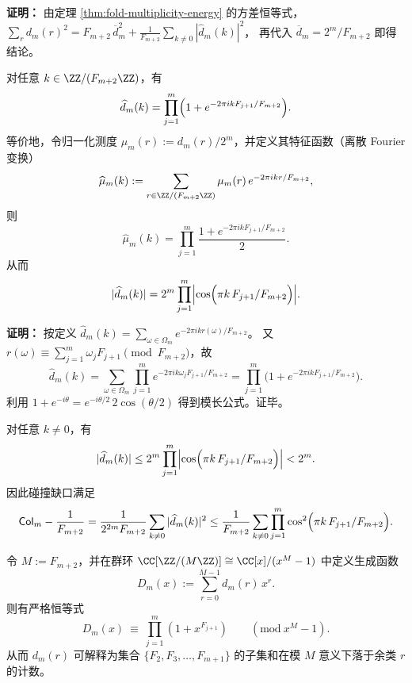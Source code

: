 \textbf{证明：}
由定理 \ref{thm:fold-multiplicity-energy} 的方差恒等式，
\(
\sum_r d_m(r)^2=F_{m+2}\,\overline d_m^2+\frac{1}{F_{m+2}}\sum_{k\ne 0}|\widehat d_m(k)|^2
\)，
再代入 $\overline d_m=2^m/F_{m+2}$ 即得结论。

\begin{theorem}
\label{thm:fold-spectrum-factorization}
对任意 $k\in\ZZ/(F_{m+2}\ZZ)$，有
\[
\widehat d_m(k)=\prod_{j=1}^m\Bigl(1+e^{-2\pi i k F_{j+1}/F_{m+2}}\Bigr).
\]
等价地，令归一化测度 \(\mu_m(r):=d_m(r)/2^m\)，并定义其特征函数（离散 Fourier 变换）
\[
\widehat\mu_m(k):=\sum_{r\in\ZZ/(F_{m+2}\ZZ)}\mu_m(r)\,e^{-2\pi i kr/F_{m+2}},
\]
则
\[
\widehat\mu_m(k)=\prod_{j=1}^m\frac{1+e^{-2\pi i k F_{j+1}/F_{m+2}}}{2}.
\]
从而
\[
|\widehat d_m(k)|=2^m\prod_{j=1}^m\Bigl|\cos\Bigl(\pi k\,F_{j+1}/F_{m+2}\Bigr)\Bigr|.
\]
\end{theorem}

\textbf{证明：}
按定义
\(
\widehat d_m(k)=\sum_{\omega\in\Omega_m}e^{-2\pi i k r(\omega)/F_{m+2}}
\)。
又 \(r(\omega)\equiv \sum_{j=1}^m \omega_j F_{j+1}\pmod{F_{m+2}}\)，故
\[
\widehat d_m(k)=\sum_{\omega\in\Omega_m}\prod_{j=1}^m e^{-2\pi i k\omega_j F_{j+1}/F_{m+2}}
=\prod_{j=1}^m\bigl(1+e^{-2\pi i k F_{j+1}/F_{m+2}}\bigr).
\]
利用 $1+e^{-i\theta}=e^{-i\theta/2}\,2\cos(\theta/2)$ 得到模长公式。证毕。

\begin{corollary}[非平凡频谱的乘性上界]
\label{cor:fold-spectrum-nontrivial-bound}
对任意 $k\ne 0$，有
\[
|\widehat d_m(k)|\le 2^m\prod_{j=1}^m\Bigl|\cos\Bigl(\pi k\,F_{j+1}/F_{m+2}\Bigr)\Bigr|<2^m.
\]
因此碰撞缺口满足
\[
\mathsf{Col}_m-\frac{1}{F_{m+2}}=\frac{1}{2^{2m}F_{m+2}}\sum_{k\ne 0}|\widehat d_m(k)|^2
\le\frac{1}{F_{m+2}}\sum_{k\ne 0}\prod_{j=1}^m\cos^2\Bigl(\pi k\,F_{j+1}/F_{m+2}\Bigr).
\]
\end{corollary}

\begin{proposition}[循环子集和计数与群环生成函数恒等式]\label{prop:fold-multiplicity-group-algebra}
令 \(M:=F_{m+2}\)，并在群环
\(
\CC[\ZZ/(M\ZZ)]\cong \CC[x]/(x^{M}-1)
\)
中定义生成函数
\[
D_m(x):=\sum_{r=0}^{M-1} d_m(r)\,x^r.
\]
则有严格恒等式
\[
\boxed{\;
D_m(x)\ \equiv\ \prod_{j=1}^{m}\left(1+x^{F_{j+1}}\right)\qquad(\mathrm{mod}\ x^{M}-1).\;}
\]
从而 \(d_m(r)\) 可解释为集合 \(\{F_{2},F_{3},\dots,F_{m+1}\}\) 的子集和在模 \(M\) 意义下落于余类 \(r\) 的计数。
\end{proposition}

